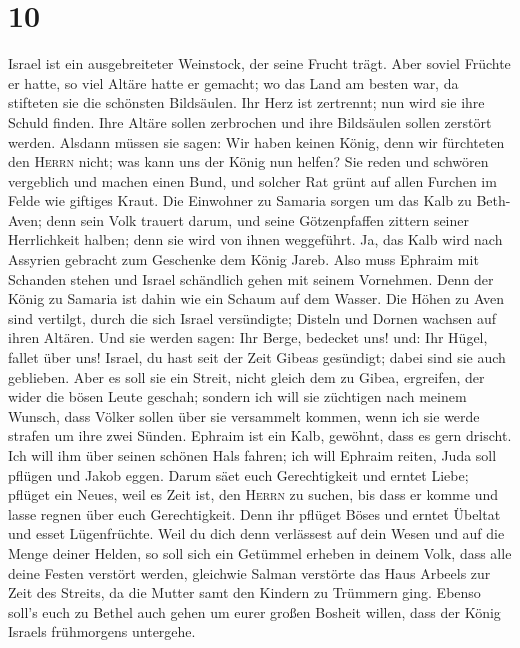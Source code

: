 \hypertarget{section-9}{%
\section{10}\label{section-9}}

 Israel ist ein ausgebreiteter Weinstock, der seine Frucht
trägt. Aber soviel Früchte er hatte, so viel Altäre hatte er gemacht; wo
das Land am besten war, da stifteten sie die schönsten Bildsäulen.
 Ihr Herz ist zertrennt; nun wird sie ihre Schuld finden.
Ihre Altäre sollen zerbrochen und ihre Bildsäulen sollen zerstört
werden.  Alsdann müssen sie sagen: Wir haben keinen König,
denn wir fürchteten den \textsc{Herrn} nicht; was kann uns der König nun
helfen?  Sie reden und schwören vergeblich und machen
einen Bund, und solcher Rat grünt auf allen Furchen im Felde wie
giftiges Kraut.  Die Einwohner zu Samaria sorgen um das
Kalb zu Beth-Aven; denn sein Volk trauert darum, und seine Götzenpfaffen
zittern seiner Herrlichkeit halben; denn sie wird von ihnen weggeführt.
 Ja, das Kalb wird nach Assyrien gebracht zum Geschenke
dem König Jareb. Also muss Ephraim mit Schanden stehen und Israel
schändlich gehen mit seinem Vornehmen.  Denn der König zu
Samaria ist dahin wie ein Schaum auf dem Wasser.  Die
Höhen zu Aven sind vertilgt, durch die sich Israel versündigte; Disteln
und Dornen wachsen auf ihren Altären. Und sie werden sagen: Ihr Berge,
bedecket uns! und: Ihr Hügel, fallet über uns!  Israel, du
hast seit der Zeit Gibeas gesündigt; dabei sind sie auch geblieben. Aber
es soll sie ein Streit, nicht gleich dem zu Gibea, ergreifen, der wider
die bösen Leute geschah;  sondern ich will sie züchtigen
nach meinem Wunsch, dass Völker sollen über sie versammelt kommen, wenn
ich sie werde strafen um ihre zwei Sünden.  Ephraim ist
ein Kalb, gewöhnt, dass es gern drischt. Ich will ihm über seinen
schönen Hals fahren; ich will Ephraim reiten, Juda soll pflügen und
Jakob eggen.  Darum säet euch Gerechtigkeit und erntet
Liebe; pflüget ein Neues, weil es Zeit ist, den \textsc{Herrn} zu
suchen, bis dass er komme und lasse regnen über euch Gerechtigkeit.
 Denn ihr pflüget Böses und erntet Übeltat und esset
Lügenfrüchte.  Weil du dich denn verlässest auf dein
Wesen und auf die Menge deiner Helden, so soll sich ein Getümmel erheben
in deinem Volk, dass alle deine Festen verstört werden, gleichwie Salman
verstörte das Haus Arbeels zur Zeit des Streits, da die Mutter samt den
Kindern zu Trümmern ging.  Ebenso soll's euch zu Bethel
auch gehen um eurer großen Bosheit willen, dass der König Israels
frühmorgens untergehe.

